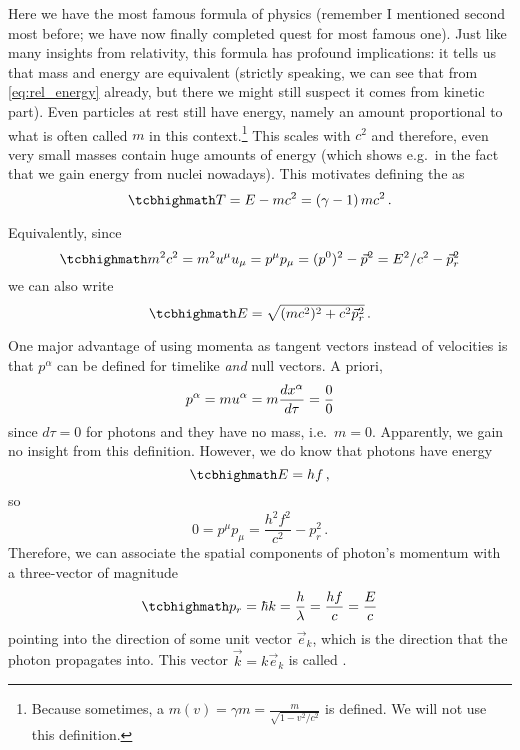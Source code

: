 \documentclass[../relativity_main.tex]{subfiles}
\begin{document}
Here we have the most famous formula of physics (remember I mentioned second most before; we have now finally completed quest for most famous one). Just like many insights from relativity, this formula has profound implications: it tells us that mass and energy are equivalent (strictly speaking, we can see that from \eqref{eq:rel_energy} already, but there we might still suspect it comes from kinetic part). Even particles at rest still have energy, namely an amount proportional to what is often called  $m$ in this context.\footnote{Because sometimes, a  $m(v) = \gamma m = \frac{m}{\sqrt{1 - v^2 / c^2}}$ is defined. We will not use this definition.} This  scales with $c^2$ and therefore, even very small masses contain huge amounts of energy (which shows e.g.~in the fact that we gain energy from nuclei nowadays). This motivates defining the  as
\begin{equation}\label{eq:rel_kin_energy}
	\eqbox{
	T = E - m c^2 = (\gamma - 1) \, m c^2
	} \, .
\end{equation}


Equivalently, since
\begin{equation}\label{eq:four_momentum_norm}
	\eqbox{
	m^2 c^2 = m^2 u^\mu u_\mu = p^\mu p_\mu = (p^0)^2 - \vec{p}^2 = E^2 / c^2 - \vec{p}_r^2
	}
\end{equation}
we can also write
\begin{equation}\label{eq:rel_energy_2}
	\eqbox{
	E = \sqrt{(m c^2)^2 + c^2 \vec{p}_r^2}
	} \, .
\end{equation}



One major advantage of using momenta as tangent vectors instead of velocities is that $p^\alpha$ can be defined for timelike \emph{and} null vectors. A priori,
\begin{equation*}
	p^\alpha = m u^\alpha = m \dv{x^\alpha}{\tau} = \frac{0}{0}
\end{equation*}
since $d\tau = 0$ for photons and they have no mass, i.e.~$m = 0$. Apparently, we gain no insight from this definition. However, we do know that photons have energy
\begin{equation}
	\eqbox{
	E = h f
	} \, ,
\end{equation}
so
\begin{equation*}
	0 = p^\mu p_\mu = \frac{h^2 f^2}{c^2} - p_r^2 \, .
\end{equation*}
Therefore, we can associate the spatial components of photon's momentum with a three-vector of magnitude
\begin{equation}\label{eq:photon_momentum}
	\eqbox{
	p_r = \hbar k = \frac{h}{\lambda} = \frac{h f}{c} = \frac{E}{c}
	}
\end{equation}
pointing into the direction of some unit vector $\vec{e}_k$, which is the direction that the photon propagates into. This vector $\vec{k} = k \vec{e}_k$ is called .
\end{document}
